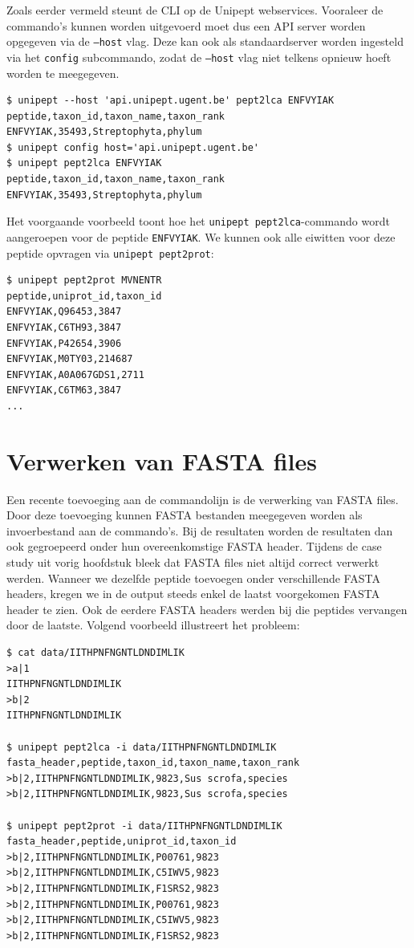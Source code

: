 Zoals eerder vermeld steunt de CLI op de Unipept webservices. Vooraleer de 
commando's kunnen worden uitgevoerd moet dus een API server worden opgegeven 
via de \texttt{--host} vlag. Deze kan ook als standaardserver worden ingesteld 
via het \texttt{config} subcommando, zodat de \texttt{--host} vlag niet telkens 
opnieuw hoeft worden te meegegeven.

\begin{lstlisting}
$ unipept --host 'api.unipept.ugent.be' pept2lca ENFVYIAK
peptide,taxon_id,taxon_name,taxon_rank
ENFVYIAK,35493,Streptophyta,phylum
$ unipept config host='api.unipept.ugent.be'
$ unipept pept2lca ENFVYIAK
peptide,taxon_id,taxon_name,taxon_rank
ENFVYIAK,35493,Streptophyta,phylum
\end{lstlisting}

Het voorgaande voorbeeld toont hoe het \texttt{unipept pept2lca}-commando wordt 
aangeroepen voor de peptide \texttt{ENFVYIAK}. We kunnen ook alle eiwitten 
voor deze peptide opvragen via \texttt{unipept pept2prot}:

\begin{lstlisting}
$ unipept pept2prot MVNENTR
peptide,uniprot_id,taxon_id
ENFVYIAK,Q96453,3847
ENFVYIAK,C6TH93,3847
ENFVYIAK,P42654,3906
ENFVYIAK,M0TY03,214687
ENFVYIAK,A0A067GDS1,2711
ENFVYIAK,C6TM63,3847
...
\end{lstlisting}

\section{Verwerken van FASTA files}
Een recente toevoeging aan de commandolijn is de verwerking van FASTA files.
Door deze toevoeging kunnen FASTA bestanden meegegeven worden als invoerbestand
aan de commando's. Bij de resultaten worden de resultaten dan ook gegroepeerd
onder hun overeenkomstige FASTA header. Tijdens de case study uit vorig
hoofdstuk bleek dat FASTA files niet altijd correct verwerkt werden. Wanneer we
dezelfde peptide toevoegen onder verschillende FASTA headers, kregen we in de
output steeds enkel de laatst voorgekomen FASTA header te zien. Ook de eerdere
FASTA headers werden bij die peptides vervangen door de laatste. Volgend
voorbeeld illustreert het probleem:

\begin{lstlisting}
$ cat data/IITHPNFNGNTLDNDIMLIK 
>a|1
IITHPNFNGNTLDNDIMLIK
>b|2
IITHPNFNGNTLDNDIMLIK

$ unipept pept2lca -i data/IITHPNFNGNTLDNDIMLIK 
fasta_header,peptide,taxon_id,taxon_name,taxon_rank
>b|2,IITHPNFNGNTLDNDIMLIK,9823,Sus scrofa,species
>b|2,IITHPNFNGNTLDNDIMLIK,9823,Sus scrofa,species

$ unipept pept2prot -i data/IITHPNFNGNTLDNDIMLIK
fasta_header,peptide,uniprot_id,taxon_id
>b|2,IITHPNFNGNTLDNDIMLIK,P00761,9823
>b|2,IITHPNFNGNTLDNDIMLIK,C5IWV5,9823
>b|2,IITHPNFNGNTLDNDIMLIK,F1SRS2,9823
>b|2,IITHPNFNGNTLDNDIMLIK,P00761,9823
>b|2,IITHPNFNGNTLDNDIMLIK,C5IWV5,9823
>b|2,IITHPNFNGNTLDNDIMLIK,F1SRS2,9823
\end{lstlisting}

